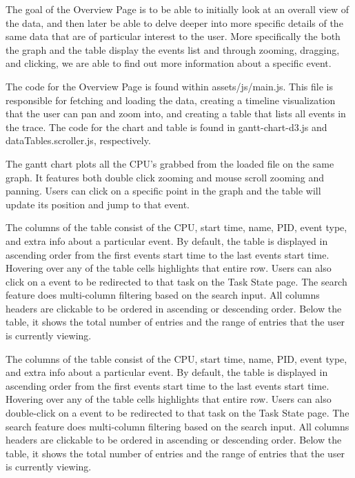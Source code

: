 \documentclass{hmcclinic}
\begin{document}
The goal of the Overview Page is to be able to initially look at an overall view of the data, and then later be able to delve deeper into more specific details of the same data that are of particular interest to the user. More specifically the both the graph and the table display the events list and through zooming, dragging, and clicking, we are able to find out more information about a specific event.

    The code for the Overview Page is found within assets/js/main.js. This file is
    responsible for fetching and loading the data, creating a timeline
    visualization that the user can pan and zoom into, and creating a table that
    lists all events in the trace. The code for the chart and table is found in
    gantt-chart-d3.js and dataTables.scroller.js, respectively.

    The gantt chart plots all the CPU's grabbed from the loaded file on the same graph. It features both double click zooming and mouse scroll zooming and panning. Users can click on a specific point in the graph and the table will update its position and jump to that event. 

    The columns of the table consist of the CPU, start time, name, PID, event type, and extra info about a particular event. By default, the table is displayed in ascending order from the first events start time to the last events start time. Hovering over any of the table cells highlights that entire row. Users can also click on a event to be redirected to that task on the Task State page. The search feature does multi-column filtering based on the search input. All columns headers are clickable to be ordered in ascending or descending order. Below the table, it shows the total number of entries and the range of entries that the user is currently viewing.
    
    The columns of the table consist of the CPU, start time, name, PID, event
    type, and extra info about a particular event. By default, the table is
    displayed in ascending order from the first events start time to the last
    events start time. Hovering over any of the table cells highlights that
    entire row. Users can also double-click on a event to be redirected to that
    task on the Task State page. The search feature does multi-column filtering
    based on the search input. All columns headers are clickable to be ordered
    in ascending or descending order. Below the table, it shows the total number
    of entries and the range of entries that the user is currently viewing.
    
\end{document}
